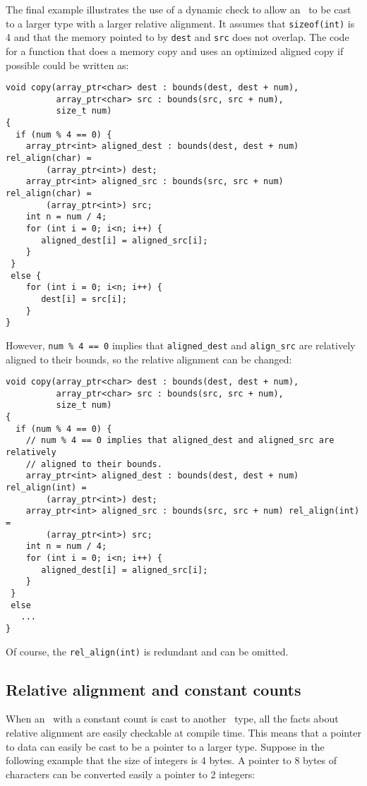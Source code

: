 The final example illustrates the use of a dynamic check to allow an
\arrayptrchar\ to be cast to a larger
type with a larger relative alignment. It assumes that
\texttt{sizeof(int)} is 4 and that the memory pointed to by
\texttt{dest} and \texttt{src} does not overlap. The code for a function
that does a memory copy and uses an optimized aligned copy if possible
could be written as:

\begin{verbatim}
void copy(array_ptr<char> dest : bounds(dest, dest + num),
          array_ptr<char> src : bounds(src, src + num), 
          size_t num)
{
  if (num % 4 == 0) {
    array_ptr<int> aligned_dest : bounds(dest, dest + num) rel_align(char) =
        (array_ptr<int>) dest;
    array_ptr<int> aligned_src : bounds(src, src + num) rel_align(char) =
        (array_ptr<int>) src;
    int n = num / 4;
    for (int i = 0; i<n; i++) {
       aligned_dest[i] = aligned_src[i];
    }
 }
 else {
    for (int i = 0; i<n; i++) {
       dest[i] = src[i];
    }
}
\end{verbatim}

However, \texttt{num \% 4 == 0} implies that \texttt{aligned\_dest} and
\texttt{align\_src} are relatively aligned to their bounds, so the
relative alignment can be changed:

\begin{verbatim}
void copy(array_ptr<char> dest : bounds(dest, dest + num),
          array_ptr<char> src : bounds(src, src + num), 
          size_t num)
{
  if (num % 4 == 0) {
    // num % 4 == 0 implies that aligned_dest and aligned_src are relatively
    // aligned to their bounds.
    array_ptr<int> aligned_dest : bounds(dest, dest + num) rel_align(int) =
        (array_ptr<int>) dest;
    array_ptr<int> aligned_src : bounds(src, src + num) rel_align(int) =
        (array_ptr<int>) src;
    int n = num / 4;
    for (int i = 0; i<n; i++) {
       aligned_dest[i] = aligned_src[i];
    }
 }
 else  
   ...
}
\end{verbatim}

Of course, the \texttt{rel\_align(int)} is redundant and can be omitted.

\subsection{Relative alignment and constant counts}

When an \arrayptr\ with a constant count is cast to another
\arrayptr\ type, all the facts about relative alignment are
easily checkable at compile time. This means that a pointer to data can
easily be cast to be a pointer to a larger type. Suppose in the
following example that the size of integers is 4 bytes. A pointer to 8
bytes of characters can be converted easily a pointer to 2 integers:

